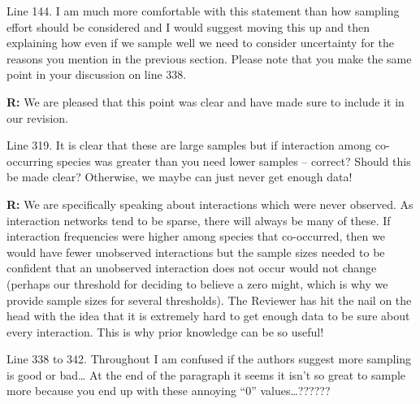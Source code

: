 \documentclass[12pt]{letter}
\newenvironment{refquote}{\bigskip \begin{it}}{\end{it}\smallskip}
\begin{document}
		\begin{refquote}
		Line 144.  I am much more comfortable with this statement than how sampling effort should be considered and I would suggest moving this up and then explaining how even if we sample well we need to consider uncertainty for the reasons you mention in the previous section.  Please note that you make the same point in your discussion on line 338.
		\end{refquote}

		\textbf{R:} We are pleased that this point was clear and have made sure to include it in our revision.

		\begin{refquote}
		Line 319.  It is clear that these are large samples but if interaction among co-occurring species was greater than you need lower samples – correct?  Should this be made clear?  Otherwise, we maybe can just never get enough data!
		\end{refquote}

		\textbf{R:} We are specifically speaking about interactions which were never observed. As interaction networks tend to be sparse, there will always be many of these. If interaction frequencies were higher among species that co-occurred, then we would have fewer unobserved interactions but the sample sizes needed to be confident that an unobserved interaction does not occur would not change (perhaps our threshold for deciding to believe a zero might, which is why we provide sample sizes for several thresholds). The Reviewer has hit the nail on the head with the idea that it is extremely hard to get enough data to be sure about every interaction. This is why prior knowledge can be so useful!

		\begin{refquote}
		Line 338 to 342.  Throughout I am confused if the authors suggest more sampling is good or bad…  At the end of the paragraph it seems it isn’t so great to sample more because you end up with these annoying “0” values…??????
		\end{refquote}
\end{document}
